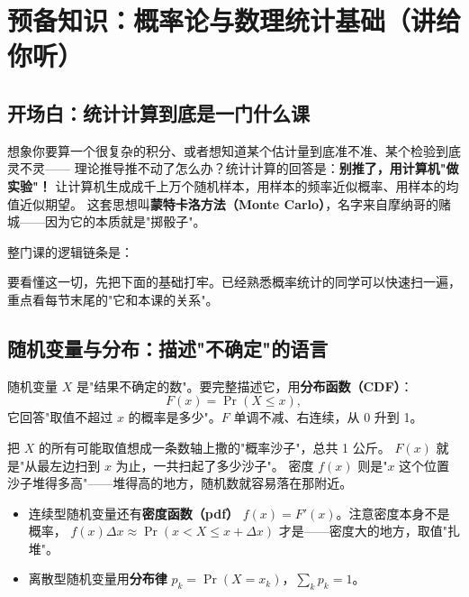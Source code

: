 \section{预备知识：概率论与数理统计基础（讲给你听）}

\subsection{开场白：统计计算到底是一门什么课}

想象你要算一个很复杂的积分、或者想知道某个估计量到底准不准、某个检验到底灵不灵——
理论推导推不动了怎么办？统计计算的回答是：\textbf{别推了，用计算机"做实验"！}
让计算机生成成千上万个随机样本，用样本的频率近似概率、用样本的均值近似期望。
这套思想叫\textbf{蒙特卡洛方法（Monte Carlo）}，名字来自摩纳哥的赌城——因为它的本质就是"掷骰子"。

整门课的逻辑链条是：
\begin{center}
\end{center}

要看懂这一切，先把下面的基础打牢。已经熟悉概率统计的同学可以快速扫一遍，重点看每节末尾的"它和本课的关系"。

\subsection{随机变量与分布：描述"不确定"的语言}

随机变量 $X$ 是"结果不确定的数"。要完整描述它，用\textbf{分布函数（CDF）}：
\[
F(x)=\Pr(X\le x),
\]
它回答"取值不超过 $x$ 的概率是多少"。$F$ 单调不减、右连续，从 0 升到 1。

\begin{pbox}
把 $X$ 的所有可能取值想成一条数轴上撒的"概率沙子"，总共 1 公斤。
$F(x)$ 就是"从最左边扫到 $x$ 为止，一共扫起了多少沙子"。
密度 $f(x)$ 则是"$x$ 这个位置沙子堆得多高"——堆得高的地方，随机数就容易落在那附近。
\end{pbox}

\begin{itemize}[leftmargin=2em]
  \item 连续型随机变量还有\textbf{密度函数（pdf）} $f(x)=F'(x)$。注意密度本身不是概率，
  $f(x)\Delta x\approx\Pr(x<X\le x+\Delta x)$ 才是——密度大的地方，取值"扎堆"。
  \item 离散型随机变量用\textbf{分布律} $p_k=\Pr(X=x_k)$，$\sum_k p_k=1$。
\end{itemize}

